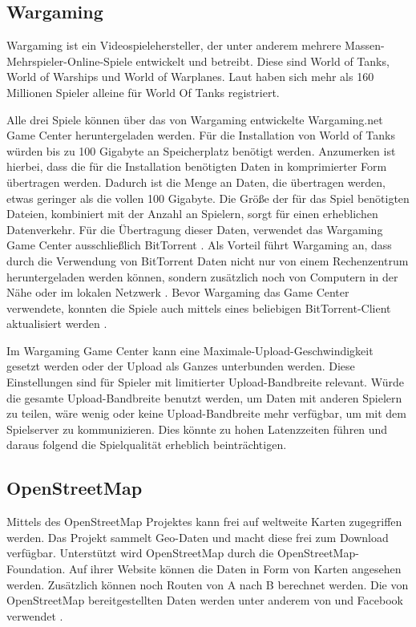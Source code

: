 \subsection{Wargaming}

Wargaming ist ein Videospielehersteller, der unter anderem mehrere Massen-Mehr\-spieler-Onl\-ine-Spiele entwickelt und betreibt. Diese sind World of Tanks, World of Warships und World of Warplanes. Laut \textcite{wotPlayerStatistics} haben sich mehr als 160 Millionen Spieler alleine für World Of Tanks registriert. 

Alle drei Spiele können über das von Wargaming entwickelte Wargaming.net Game Center heruntergeladen werden. Für die Installation von World of Tanks würden bis zu 100 Gigabyte an Speicherplatz benötigt werden. Anzumerken ist hierbei, dass die für die Installation benötigten Daten in komprimierter Form übertragen werden. Dadurch ist die Menge an Daten, die übertragen werden, etwas geringer als die vollen 100 Gigabyte. Die Größe der für das Spiel benötigten Dateien, kombiniert mit der Anzahl an Spielern, sorgt für einen erheblichen Datenverkehr. Für die Übertragung dieser Daten, verwendet das Wargaming Game Center ausschließlich BitTorrent \parencite{wargamingNetworkInteraction}. Als Vorteil führt Wargaming an, dass durch die Verwendung von BitTorrent Daten nicht nur von einem Rechenzentrum heruntergeladen werden können, sondern zusätzlich noch von Computern in der Nähe oder im lokalen Netzwerk \parencite{wargamingNetworkInteraction}. Bevor Wargaming  das Game Center verwendete, konnten die Spiele auch mittels eines beliebigen BitTorrent-Client aktualisiert werden \parencite{wotFaq}. 

Im Wargaming Game Center kann eine Maximale-Upload-Geschwindigkeit gesetzt werden oder der Upload als Ganzes unterbunden werden. Diese Einstellungen sind für Spieler mit limitierter Upload-Bandbreite relevant. Würde die gesamte Upload-Bandbreite benutzt werden, um Daten mit anderen Spielern zu teilen, wäre wenig oder keine Upload-Bandbreite mehr verfügbar, um mit dem Spielserver zu kommunizieren. Dies könnte zu hohen Latenzzeiten führen und daraus folgend die Spielqualität erheblich beinträchtigen.


\subsection{OpenStreetMap}

Mittels des OpenStreetMap Projektes kann frei auf weltweite Karten zugegriffen werden. Das Projekt sammelt Geo-Daten und macht diese frei zum Download verfügbar. Unterstützt wird OpenStreetMap durch die OpenStreetMap-Foundation. Auf ihrer Website können die Daten in Form von Karten angesehen werden. Zusätzlich können noch Routen von A nach B berechnet werden. Die von OpenStreetMap bereitgestellten Daten werden unter anderem von \textcite{osmApple} und Facebook verwendet \parencite{osmFacebook}. 

